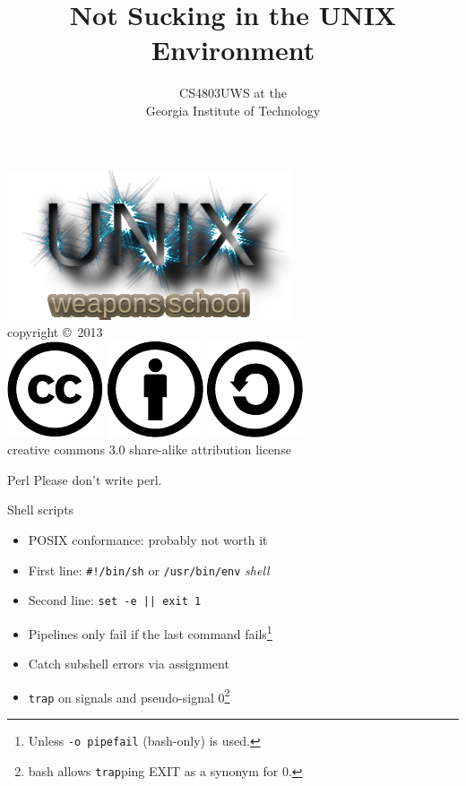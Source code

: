 \documentclass[mathserif,xcolor={dvipsnames,table}]{beamer}
\title{\textbf{Not Sucking in the UNIX Environment}}
\date{}
\author{CS4803UWS at the\\
Georgia Institute of Technology
}
\begin{document}
\begin{frame}
\titlepage
\begin{center}
\includegraphics[scale=0.33]{images/uws.png}\\
\vspace{.1in}
\tiny{copyright \copyright\ 2013}\\
\includegraphics[scale=.25]{images/cc-logo.pdf}
\includegraphics[scale=.25]{images/cc-new.pdf}
\includegraphics[scale=.25]{images/cc-share.pdf}\\
\tiny{creative commons 3.0 share-alike attribution license}
\end{center}
\end{frame}

\begin{frame}{Perl}
Please don't write perl.
\end{frame}

\begin{frame}{Shell scripts}
\begin{itemize}
\item POSIX conformance: probably not worth it
\item First line: \texttt{\#!/bin/sh} or \texttt{/usr/bin/env} \textit{shell}
\item Second line: \texttt{set -e || exit 1}
\item Pipelines only fail if the last command fails\footnote{Unless \texttt{-o pipefail} (bash-only) is used.}
\item Catch subshell errors via assignment
\item \texttt{trap} on signals and pseudo-signal 0\footnote{bash allows \texttt{trap}ping EXIT as a synonym for 0.}
\end{itemize}
\end{frame}
\end{document}
